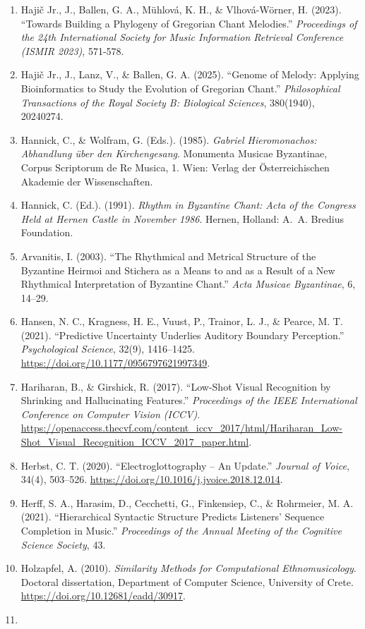 \documentclass[11pt,a4paper]{article}
\begin{document}
\begin{enumerate}
\item
 Hajič Jr., J., Ballen, G. A., Mühlová, K. H., \& Vlhová-Wörner, H. (2023). ``Towards Building a Phylogeny of Gregorian Chant Melodies.'' \emph{Proceedings of the 24th International Society for Music Information Retrieval Conference (ISMIR 2023)}, 571-578.
\item
 Hajič Jr., J., Lanz, V., \& Ballen, G. A. (2025). ``Genome of Melody: Applying Bioinformatics to Study the Evolution of Gregorian Chant.'' \emph{Philosophical Transactions of the Royal Society B: Biological Sciences}, 380(1940), 20240274.
\item
 Hannick, C., \& Wolfram, G. (Eds.). (1985). \emph{Gabriel Hieromonachos: Abhandlung über den Kirchengesang}. Monumenta Musicae Byzantinae, Corpus Scriptorum de Re Musica, 1. Wien: Verlag der Österreichischen Akademie der Wissenschaften.
\item
 Hannick, C. (Ed.). (1991). \emph{Rhythm in Byzantine Chant: Acta of the Congress Held at Hernen Castle in November 1986}. Hernen, Holland: A.~A. Bredius Foundation.
\item
 Arvanitis, I. (2003). ``The Rhythmical and Metrical Structure of the Byzantine Heirmoi and Stichera as a Means to and as a Result of a New Rhythmical Interpretation of Byzantine Chant.'' \emph{Acta Musicae Byzantinae}, 6, 14--29.
\item
 Hansen, N. C., Kragness, H. E., Vuust, P., Trainor, L. J., \& Pearce, M. T. (2021). ``Predictive Uncertainty Underlies Auditory Boundary Perception.'' \emph{Psychological Science}, 32(9), 1416--1425. \url{https://doi.org/10.1177/0956797621997349}.
\item
 Hariharan, B., \& Girshick, R. (2017). ``Low-Shot Visual Recognition by Shrinking and Hallucinating Features.'' \emph{Proceedings of the IEEE International Conference on Computer Vision (ICCV)}. \url{https://openaccess.thecvf.com/content_iccv_2017/html/Hariharan_Low-Shot_Visual_Recognition_ICCV_2017_paper.html}.
\item
 Herbst, C. T. (2020). ``Electroglottography -- An Update.'' \emph{Journal of Voice}, 34(4), 503--526. \url{https://doi.org/10.1016/j.jvoice.2018.12.014}.
\item
 Herff, S. A., Harasim, D., Cecchetti, G., Finkensiep, C., \& Rohrmeier, M. A. (2021). ``Hierarchical Syntactic Structure Predicts Listeners' Sequence Completion in Music.'' \emph{Proceedings of the Annual Meeting of the Cognitive Science Society}, 43.
\item
 Holzapfel, A. (2010). \emph{Similarity Methods for Computational Ethnomusicology}. Doctoral dissertation, Department of Computer Science, University of Crete. \url{https://doi.org/10.12681/eadd/30917}.
\item



\end{enumerate}
\end{document}
